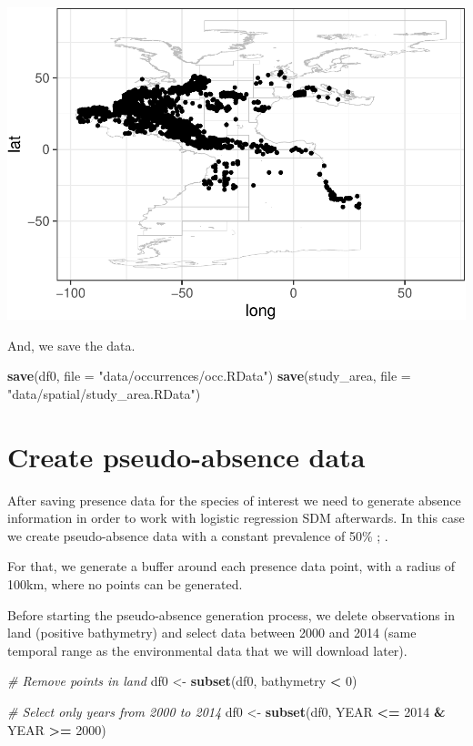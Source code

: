 \documentclass[
]{book}
\newenvironment{Shaded}{\begin{snugshade}}{\end{snugshade}}
\newcommand{\AttributeTok}[1]{\textcolor[rgb]{0.13,0.29,0.53}{#1}}
\newcommand{\CommentTok}[1]{\textcolor[rgb]{0.56,0.35,0.01}{\textit{#1}}}
\newcommand{\DecValTok}[1]{\textcolor[rgb]{0.00,0.00,0.81}{#1}}
\newcommand{\FunctionTok}[1]{\textcolor[rgb]{0.13,0.29,0.53}{\textbf{#1}}}
\newcommand{\NormalTok}[1]{#1}
\newcommand{\OtherTok}[1]{\textcolor[rgb]{0.56,0.35,0.01}{#1}}
\newcommand{\SpecialCharTok}[1]{\textcolor[rgb]{0.81,0.36,0.00}{\textbf{#1}}}
\newcommand{\StringTok}[1]{\textcolor[rgb]{0.31,0.60,0.02}{#1}}
\begin{document}
\includegraphics{_main_files/figure-latex/unnamed-chunk-14-1.pdf}

And, we save the data.

\begin{Shaded}
\begin{Highlighting}[]
\FunctionTok{save}\NormalTok{(df0, }\AttributeTok{file =} \StringTok{"data/occurrences/occ.RData"}\NormalTok{)}
\FunctionTok{save}\NormalTok{(study\_area, }\AttributeTok{file =} \StringTok{"data/spatial/study\_area.RData"}\NormalTok{)}
\end{Highlighting}
\end{Shaded}

\section{Create pseudo-absence data}\label{create-pseudo-absence-data}

After saving presence data for the species of interest we need to generate absence information in order to work with logistic regression SDM afterwards. In this case we create pseudo-absence data with a constant prevalence of 50\% \citep{mcpherson_2004}; \citep{barbetmassin_etal_2012}.

For that, we generate a buffer around each presence data point, with a radius of 100km, where no points can be generated.

Before starting the pseudo-absence generation process, we delete observations in land (positive bathymetry) and select data between 2000 and 2014 (same temporal range as the environmental data that we will download later).

\begin{Shaded}
\begin{Highlighting}[]
\CommentTok{\# Remove points in land}
\NormalTok{df0 }\OtherTok{\textless{}{-}} \FunctionTok{subset}\NormalTok{(df0, bathymetry }\SpecialCharTok{\textless{}} \DecValTok{0}\NormalTok{)}

\CommentTok{\# Select only years from 2000 to 2014}
\NormalTok{df0 }\OtherTok{\textless{}{-}} \FunctionTok{subset}\NormalTok{(df0, YEAR }\SpecialCharTok{\textless{}=} \DecValTok{2014} \SpecialCharTok{\&}\NormalTok{ YEAR }\SpecialCharTok{\textgreater{}=}
    \DecValTok{2000}\NormalTok{)}
\end{Highlighting}
\end{Shaded}
\end{document}
